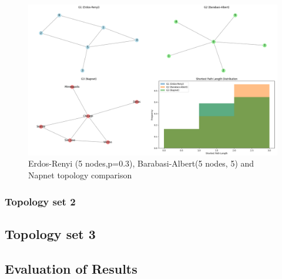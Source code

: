 \begin{figure}
    \centering
    \includegraphics[width=0.7\linewidth]{images/final-topo-comparison/napnet/3_1.png}
    \caption{Erdos-Renyi (5 nodes,p=0.3), Barabasi-Albert(5 nodes, 5) and Napnet topology comparison}
    \label{fig:napnet_3}
\end{figure}

\subsubsection{Topology set 2}
\subsection{Topology set 3}

\subsection{Evaluation of Results}